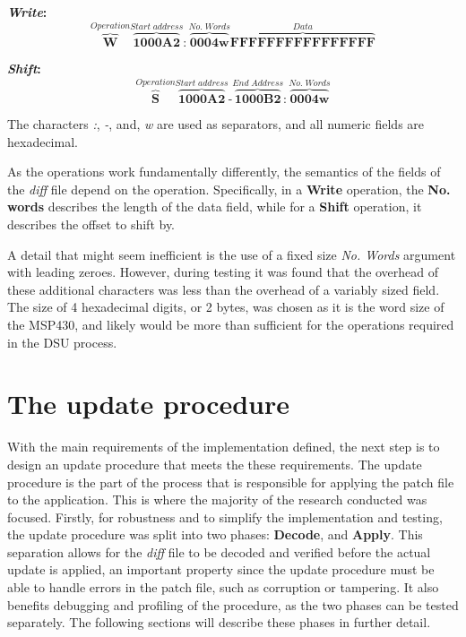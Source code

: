 \textbf{\textit{Write}:}
\begin{equation*}
    \overbrace{\textbf{W}}^{Operation}
    \overbrace{\textbf{1000A2}}^{Start\;address}    :
    \overbrace{\textbf{0004w}}^{No.\;Words}
    \overbrace{\textbf{FFFFFFFFFFFFFFFF}}^{Data}
\end{equation*}

\textbf{\textit{Shift}:}
\begin{equation*}
    \overbrace{\textbf{S}}^{Operation}
    \overbrace{\textbf{1000A2}}^{Start\;address}    \text{-}
    \overbrace{\textbf{1000B2}}^{End\;Address}      :
    \overbrace{\textbf{0004w}}^{No.\;Words}
\end{equation*}

\noindent The characters \textit{:}, \textit{-}, and, \textit{w} are used as separators, and all numeric fields are hexadecimal.

As the operations work fundamentally differently, the semantics of the fields of the \textit{diff} file depend on the operation. Specifically, in a \textbf{Write} operation, the \textbf{No. words} describes the length of the data field, while for a \textbf{Shift} operation, it describes the offset to shift by.

A detail that might seem inefficient is the use of a fixed size \textit{No. Words} argument with leading zeroes. However, during testing it was found that the overhead of these additional characters was less than the overhead of a variably sized field. The size of 4 hexadecimal digits, or 2 bytes, was chosen as it is the word size of the MSP430, and likely would be more than sufficient for the operations required in the DSU process. 

\section{The update procedure}\label{sec:updateprocedure}
With the main requirements of the implementation defined, the next step is to design an update procedure that meets the these requirements. The update procedure is the part of the process that is responsible for applying the patch file to the application. This is where the majority of the research conducted was focused. Firstly, for robustness and to simplify the implementation and testing, the update procedure was split into two phases: \textbf{Decode}, and \textbf{Apply}. This separation allows for the \textit{diff} file to be decoded and verified before the actual update is applied, an important property since the update procedure must be able to handle errors in the patch file, such as corruption or tampering. It also benefits debugging and profiling of the procedure, as the two phases can be tested separately. The following sections will describe these phases in further detail. 

